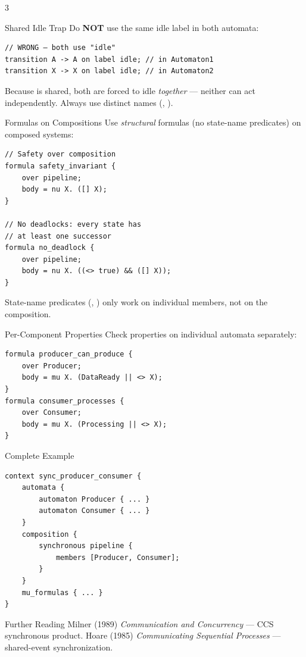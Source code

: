 \begin{multicols}{3}
\begin{warnbox}{Shared Idle Trap}
Do \textbf{NOT} use the same idle label in both automata:
\begin{lstlisting}[style=ctxdsl]
// WRONG — both use "idle"
transition A -> A on label idle; // in Automaton1
transition X -> X on label idle; // in Automaton2
\end{lstlisting}
Because  is shared, both are forced to idle \emph{together} --- neither can act independently.  Always use distinct names (, ).
\end{warnbox}


\begin{cheatbox}{Formulas on Compositions}
Use \emph{structural} formulas (no state-name predicates) on composed systems:
\begin{lstlisting}[style=ctxdsl]
// Safety over composition
formula safety_invariant {
    over pipeline;
    body = nu X. ([] X);
}

// No deadlocks: every state has
// at least one successor
formula no_deadlock {
    over pipeline;
    body = nu X. ((<> true) && ([] X));
}
\end{lstlisting}
State-name predicates (, ) only work on individual members, not on the composition.
\end{cheatbox}

\begin{cheatbox}{Per-Component Properties}
Check properties on individual automata separately:
\begin{lstlisting}[style=ctxdsl]
formula producer_can_produce {
    over Producer;
    body = mu X. (DataReady || <> X);
}
formula consumer_processes {
    over Consumer;
    body = mu X. (Processing || <> X);
}
\end{lstlisting}
\end{cheatbox}

\begin{tipbox}{Complete Example}
\begin{lstlisting}[style=ctxdsl]
context sync_producer_consumer {
    automata {
        automaton Producer { ... }
        automaton Consumer { ... }
    }
    composition {
        synchronous pipeline {
            members [Producer, Consumer];
        }
    }
    mu_formulas { ... }
}
\end{lstlisting}
\end{tipbox}

\begin{tipbox}{Further Reading}
Milner (1989) \textit{Communication and Concurrency} --- CCS synchronous product.
Hoare (1985) \textit{Communicating Sequential Processes} --- shared-event synchronization.
\end{tipbox}

\end{multicols}

